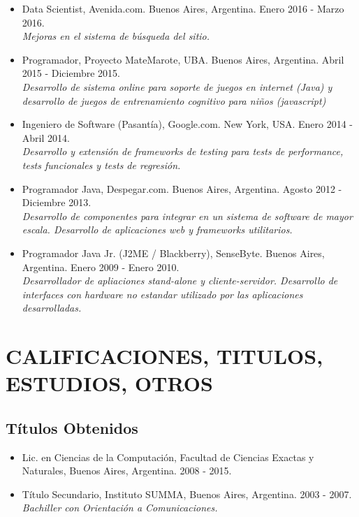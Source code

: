 \documentclass[a4paper,10pt]{article}
\begin{document}
\begin{itemize}
    \item {Data Scientist, Avenida.com. Buenos Aires, Argentina.
            Enero 2016 - Marzo 2016. \\
            {\small \itshape Mejoras en el sistema de búsqueda del sitio.}}

    \item {Programador, Proyecto MateMarote, UBA. Buenos Aires, Argentina.
            Abril 2015 - Diciembre 2015. \\
            {\small \itshape Desarrollo de sistema online para soporte de
        juegos en internet (Java) y desarrollo de juegos de entrenamiento
cognitivo para niños (javascript)}}

    \item {Ingeniero de Software (Pasantía), Google.com. New York, USA. Enero
            2014 - Abril 2014. \\ 
    {\small \itshape Desarrollo y extensión de frameworks de testing para tests
de performance, tests funcionales y tests de regresión.}}

    \item {Programador Java, Despegar.com. Buenos Aires, Argentina. Agosto 2012
           - Diciembre 2013. \\
    {\small \itshape Desarrollo de componentes para integrar en un sistema de
software de mayor escala. Desarrollo de aplicaciones web y frameworks
utilitarios.}}

    \item {Programador Java Jr. (J2ME / Blackberry), SenseByte. Buenos Aires,
            Argentina. Enero 2009 - Enero 2010. \\ 
    {\small \itshape Desarrollador de apliaciones stand-alone y
cliente-servidor.  Desarrollo de interfaces con hardware no estandar utilizado
por las aplicaciones desarrolladas.}}

\end{itemize}

\section{CALIFICACIONES, TITULOS, ESTUDIOS, OTROS}

\subsection{Títulos Obtenidos}

\begin{itemize}
    \item {Lic. en Ciencias de la Computación, Facultad de Ciencias Exactas y
        Naturales, Buenos Aires, Argentina. 2008 - 2015.}
    \item {Título Secundario, Instituto SUMMA, Buenos Aires, Argentina. 2003
            - 2007. \\
        {\small \itshape Bachiller con Orientación a Comunicaciones.}}
\end{itemize}
\end{document}
